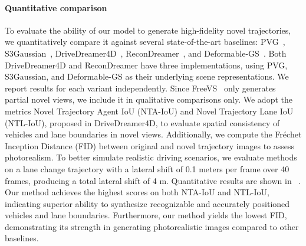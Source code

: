 \paragraph{Quantitative comparison} To evaluate the ability of our model to generate high-fidelity novel trajectories, we quantitatively compare it against several state-of-the-art baselines: PVG~\cite{chen2023periodic}, S3Gaussian~\cite{huang2024s3gaussian}, DriveDreamer4D~\cite{zhao2024drive}, ReconDreamer~\cite{Ni2024ReconDreamerCW}, and Deformable-GS~\cite{yang2023deformable3dgs}. Both DriveDreamer4D and ReconDreamer have three implementations, using PVG, S3Gaussian, and Deformable-GS as their underlying scene representations. We report results for each variant independently. Since FreeVS~\cite{wang2024freevs} only generates partial novel views, we include it in qualitative comparisons only. We adopt the metrics Novel Trajectory Agent IoU (NTA-IoU) and Novel Trajectory Lane IoU (NTL-IoU), proposed in DriveDreamer4D, to evaluate spatial consistency of vehicles and lane boundaries in novel views. Additionally, we compute the Fréchet Inception Distance (FID) between original and novel trajectory images to assess photorealism. To better simulate realistic driving scenarios, we evaluate methods on a lane change trajectory with a lateral shift of 0.1 meters per frame over 40 frames, producing a total lateral shift  of 4 m. Quantitative results are shown in ~. Our method achieves the highest scores on both NTA-IoU and NTL-IoU, indicating superior ability to synthesize recognizable and accurately positioned vehicles and lane boundaries. Furthermore, our method yields the lowest FID, demonstrating its strength in generating photorealistic images compared to other baselines.



